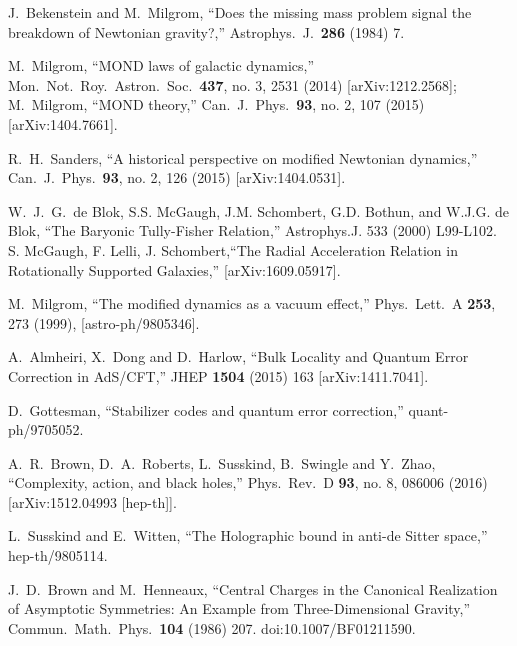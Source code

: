 \documentclass[a4paper,12pt]{article}
\begin{document}
\begin{thebibliography}{100}
  J.~Bekenstein and M.~Milgrom,
  ``Does the missing mass problem signal the breakdown of Newtonian gravity?,''
  Astrophys.\ J.\  {\bf 286} (1984) 7.

 M.~Milgrom,
 ``MOND laws of galactic dynamics,''
 Mon.\ Not.\ Roy.\ Astron.\ Soc.\  {\bf 437}, no. 3, 2531 (2014)
 [arXiv:1212.2568];  M.~Milgrom,
 ``MOND theory,''
 Can.\ J.\ Phys.\  {\bf 93}, no. 2, 107 (2015)
 [arXiv:1404.7661].

 R.~H.~Sanders,
 ``A historical perspective on modified Newtonian dynamics,''
 Can.\ J.\ Phys.\  {\bf 93}, no. 2, 126 (2015)
 [arXiv:1404.0531].


W.~J.~G.~de Blok, S.S. McGaugh, J.M. Schombert, G.D. Bothun, and W.J.G. de Blok,
 ``The Baryonic Tully-Fisher Relation,''
Astrophys.J. 533 (2000) L99-L102.  
 S. McGaugh, F. Lelli, J. Schombert,``The Radial Acceleration Relation in Rotationally Supported Galaxies,'' [arXiv:1609.05917]. 

 M.~Milgrom,
 ``The modified dynamics as a vacuum effect,''
 Phys.\ Lett.\ A {\bf 253}, 273 (1999),
 [astro-ph/9805346].



  A.~Almheiri, X.~Dong and D.~Harlow,
  ``Bulk Locality and Quantum Error Correction in AdS/CFT,''
  JHEP {\bf 1504} (2015) 163
  [arXiv:1411.7041].



  D.~Gottesman,
  ``Stabilizer codes and quantum error correction,''
  quant-ph/9705052.



  A.~R.~Brown, D.~A.~Roberts, L.~Susskind, B.~Swingle and Y.~Zhao,
  ``Complexity, action, and black holes,''
  Phys.\ Rev.\ D {\bf 93}, no. 8, 086006 (2016)
  [arXiv:1512.04993 [hep-th]].
   
  




 L.~Susskind and E.~Witten,
 ``The Holographic bound in anti-de Sitter space,''
 hep-th/9805114.
  
 


J.~D.~Brown and M.~Henneaux,
  ``Central Charges in the Canonical Realization of Asymptotic Symmetries: An Example from Three-Dimensional Gravity,''
  Commun.\ Math.\ Phys.\  {\bf 104} (1986) 207.
  doi:10.1007/BF01211590.


\end{thebibliography}
\end{document}
